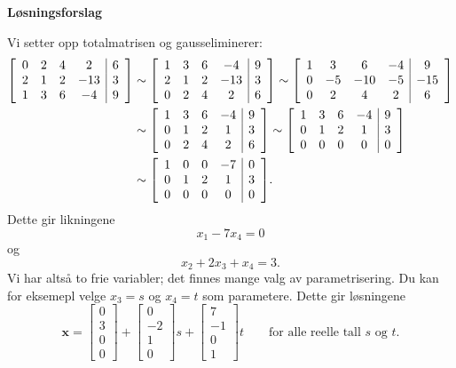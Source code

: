 \documentclass[notitlepage,a4paper,12pt,norsk]{IMFeksamen}
\newcommand{\roweq}{\sim}
\newcommand{\V}[1]{\mathbf{#1}}
\newcommand{\vvvv}[4]{\begin{bmatrix} #1 \\ #2 \\ #3 \\ #4 \end{bmatrix}}
\newcommand{\x}{\V{x}}
\newcommand{\0}{\V{0}}
\newenvironment{amatrix}[1]{%
  \left[\begin{array}{*{#1}{c}|c}
}{%
  \end{array}\right]
}
\newcommand{\oppgslutt}{
\begin{center}
\pgfornament[width=6cm]{88}
\end{center}
}
\newenvironment{losning}{\begin{oppgave}}{\oppgslutt\end{oppgave}}
\begin{document}
\begin{center}
\textbf{\large Løsningsforslag} \\[3pt]
\end{center}
\vspace{-10pt}


\begin{losning}
Vi setter opp totalmatrisen og gausseliminerer:
\begin{align*}
\begin{amatrix}{4}
0 & 2 & 4 &   2 & 6 \\
2 & 1 & 2 & -13 & 3 \\
1 & 3 & 6 &  -4 & 9
\end{amatrix}
&\roweq 
\begin{amatrix}{4}
1 & 3 & 6 &  -4 & 9 \\
2 & 1 & 2 & -13 & 3 \\
0 & 2 & 4 &   2 & 6
\end{amatrix}
\roweq
\begin{amatrix}{4}
1 & 3 & 6 &  -4 & 9 \\
0 & -5 & -10 & -5 & -15 \\
0 & 2 & 4 &   2 & 6
\end{amatrix}\\
&\roweq 
\begin{amatrix}{4}
1 & 3 & 6 &  -4 & 9 \\
0 & 1 & 2 & 1 & 3 \\
0 & 2 & 4 &   2 & 6
\end{amatrix}
\roweq 
\begin{amatrix}{4}
1 & 3 & 6 &  -4 & 9 \\
0 & 1 & 2 & 1 & 3 \\
0 & 0 & 0 &  0 & 0
\end{amatrix}
\\
&\roweq
\begin{amatrix}{4}
1 & 0 & 0 &  -7 & 0 \\
0 & 1 & 2 & 1 & 3 \\
0 & 0 & 0 &  0 & 0
\end{amatrix}.
\end{align*}
Dette gir likningene 
\[
x_1-7x_4=0
\]
og
\[
x_2+2x_3+x_4=3.
\]
Vi har altså to frie variabler;
det finnes mange valg av parametrisering.
Du kan for eksemepl velge $x_3=s$ og $x_4=t$ som parametere.
Dette gir løsningene
\[
\x = \vvvv{0}{3}{0}{0} + \vvvv{0}{-2}{1}{0} s + \vvvv{7}{-1}{0}{1} t
\qquad
\text{for alle reelle tall $s$ og~$t$.}
\]
\end{losning}
\end{document}
